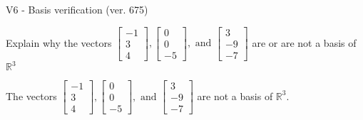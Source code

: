 \begin{exercise}
  \begin{exerciseTitle}V6 - Basis verification (ver. 675)\end{exerciseTitle}
  \begin{exerciseStatement}
    Explain why the vectors \(\left[\begin{array}{r}
-1 \\
3 \\
4
\end{array}\right] , \left[\begin{array}{r}
0 \\
0 \\
-5
\end{array}\right] , \text{ and } \left[\begin{array}{r}
3 \\
-9 \\
-7
\end{array}\right]\) are or are not a basis of \(\mathbb{R}^3\)	


  \end{exerciseStatement}
  \begin{exerciseAnswer}
   The vectors \(\left[\begin{array}{r}
-1 \\
3 \\
4
\end{array}\right] , \left[\begin{array}{r}
0 \\
0 \\
-5
\end{array}\right] , \text{ and } \left[\begin{array}{r}
3 \\
-9 \\
-7
\end{array}\right]\) 
  	 are not  a basis of \(\mathbb{R}^3\).
  


  \end{exerciseAnswer}
\end{exercise}